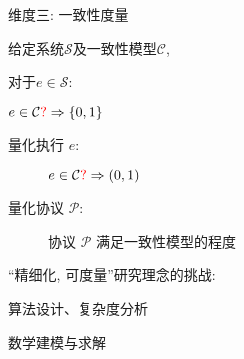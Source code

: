 \begin{frame}{维度三: 一致性度量}
  \begin{center}
	给定系统$\mathcal{S}$及一致性模型$\mathcal{C}$,
  \end{center}

  \pause

  对于$e \in \mathcal{S}$:
  \begin{description}
	\setlength{\itemsep}{5pt}
	\item[验证 (verify):] $e \in \mathcal{C} \textcolor{red}{\mathbf{?}} \Rightarrow \{0,1\}$ 
	\item[量化 (quantify):] \hfill
	  \begin{description}
		\item[量化执行 $e$:] $e \in \mathcal{C} \textcolor{red}{\mathbf{?}} \Rightarrow (0,1)$ 
		  \pause
		\item[量化协议 $\mathcal{P}$:] 协议 $\mathcal{P}$ 满足一致性模型的程度
	  \end{description}
  \end{description}

  \pause
  \vspace{0.50cm}

  \begin{center}
	``精细化, 可度量''研究理念的挑战:
	\vspace{8pt}
	\begin{description}
	  \centering
	  \item[验证:] 算法设计、复杂度分析
	  \item[量化:] 数学建模与求解
	\end{description}
  \end{center}
\end{frame}
